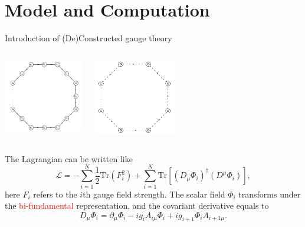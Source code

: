\documentclass{beamer}
\begin{document}
\section{Model and Computation}

\begin{frame}{Introduction of (De)Constructed gauge theory}
\vspace{1em}
\begin{columns}[c]
    \centering
    \includegraphics[width=100pt]{Moose.png}

    \centering

    \centering
    \includegraphics[width=100pt]{Moosed.jpeg}
\end{columns}


\pause
\raggedright
The Lagrangian can be written like
\begin{equation*}
    \mathcal{L} = -\sum_{i=1}^{N} \frac{1}{2} \mathrm{Tr}(F_i^2)
    + \sum_{i=1}^{N} \mathrm{Tr}\left[(D_\mu \Phi_i)^\dagger (D^\mu \Phi_i)\right],
\end{equation*}
here $F_i$ refers to the $i$th gauge field strength. The scalar field $\Phi_i$ transforms under the \textcolor{red}{bi-fundamental} representation, and the covariant derivative equals to
\begin{equation*}
    D_\mu \Phi_i = \partial_\mu \Phi_i - i g_i A_{i\mu} \Phi_i + i g_{i+1} \Phi_i A_{i+1\mu}.
\end{equation*}

\end{frame}
\end{document}
